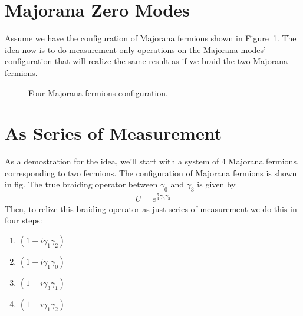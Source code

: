 \documentclass{article}
\begin{document}
\section{Majorana Zero Modes} %
\label{sec:Majorana Zero Modes}
Assume we have the configuration of Majorana fermions shown in Figure~\ref{fig:4 mf conf}.
The idea now is to do measurement only operations on the Majorana modes' configuration that will realize
the same result as if we braid the two Majorana fermions.\cite{Leijnse_2012}
\begin{figure}
	\begin{center}
		
	\end{center}
	\caption{Four Majorana fermions configuration.}
	\label{fig:4 mf conf}
\end{figure}


\section{As Series of Measurement} %
\label{sec:As Series of measurement}
As a demostration for the idea, we'll start with a system of 4 Majorana fermions,
corresponding to two fermions. The configuration of Majorana fermions is shown in fig.
The true braiding operator between $\gamma_0$ and $ \gamma_3 $ is given by
\begin{align}
	U = e^{\frac{\pi}{4} \gamma_0 \gamma_3}
	\label{eq:braiding op}
\end{align}
Then, to relize this braiding operator as just series of measurement we do this in four steps:
\begin{enumerate}
	\item $ (1 + i \gamma_1 \gamma_2) $
	\item $ (1 + i \gamma_1 \gamma_0) $
	\item $ (1 + i \gamma_3 \gamma_1) $
	\item $ (1 + i \gamma_1 \gamma_2) $
\end{enumerate}
\end{document}
